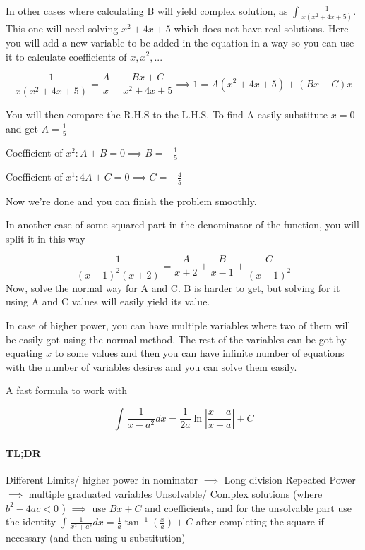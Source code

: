 \documentclass{article}
\begin{document}
	In other cases where calculating B will yield complex solution, as $ \int \frac{1}{x(x^2+4x+5)}$.
	This one will need solving $ x^2+4x+5 $ which does not have real solutions. Here you will add a new variable to be added in the equation in a way so you can use it to calculate coefficients of $ x, x^2, ... $

	\[	\frac{1}{x(x^2+4x+5)}= \frac{A}{x} + \frac{ Bx+C }{ x^2+4x+5 }  
	\implies 1 = A(x^2+4x+5) + (Bx+C)x
	\]

	You will then compare the R.H.S to the L.H.S. To find A easily substitute $ x=0 $ and get $ A = \frac{1}{5} $ 

	\begin{center}

		Coefficient of $ x^2: A+B = 0 \implies B = -\frac{1}{5}   $ 

		Coefficient of $ x^1: 4A+C = 0 \implies C = -\frac{4}{5} $ 

	\end{center}


	Now we're done and you can finish the problem smoothly.	



	In another case of some squared part in the denominator of the function, you will split it in this way

	\[
		\frac{1}{(x-1)^2(x+2)}  = \frac{A}{x+2} + \frac{B}{x-1} + \frac{C}{(x-1)^2}
	\]
	Now, solve the normal way for A and C. B is harder to get, but solving for it using A and C values will easily yield its value.

	In case of higher power, you can have multiple variables where two of them will be easily got using the normal method. The rest of the variables can be got by equating $x$ to some values and then you can have infinite number of equations with the number of variables desires and you can solve them easily. \newline

	A fast formula to work with 

	\[
		\int^{}_{} \frac{1}{x-a^2} dx =   \frac{1}{2a} \ln{ | \frac{ x-a }{ x+a }  |  } + C
	\]

	\paragraph{TL;DR}

	Different Limits/ higher power in nominator $ \implies $ Long division \newline 
	Repeated Power $ \implies $ multiple graduated variables\newline
	Unsolvable/ Complex solutions (where $ b^2 -4ac < 0 $ ) $ \implies $ use $ Bx+C $ and coefficients, and for the unsolvable part use the identity $ \int^{}_{} \frac{1}{x^2+a^2} dx = \frac{1}{a} \tan^{-1}(\frac{x}{a})+C  $ after completing the square if necessary (and then using u-substitution)\newline
\end{document}
